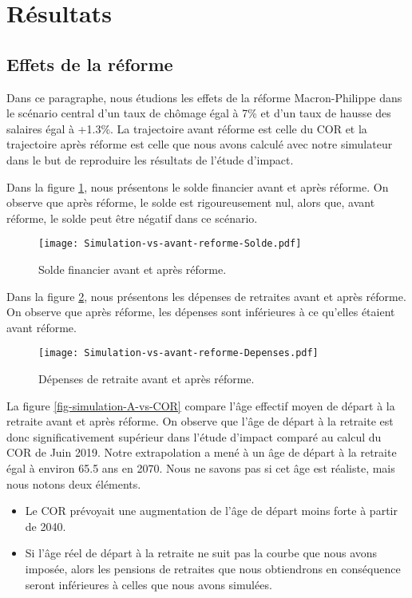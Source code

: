 \documentclass[10pt]{article}
\begin{document}

\section{Résultats}

\subsection{Effets de la réforme}

Dans ce paragraphe, nous étudions les effets de la réforme Macron-Philippe dans 
le scénario central d'un taux de chômage égal à 7\% 
et d'un taux de hausse des salaires égal à +1.3\%. 
La trajectoire avant réforme est celle du COR et la trajectoire après réforme est celle 
que nous avons calculé avec notre simulateur dans le but de reproduire les 
résultats de l'étude d'impact. 

Dans la figure \ref{fig-solde-avant-apres-reforme}, nous présentons le 
solde financier avant et après réforme. 
On observe que après réforme, le solde est rigoureusement nul, 
alors que, avant réforme, le solde peut être négatif dans ce scénario. 

\begin{figure}
\begin{center}
\texttt{[image: Simulation-vs-avant-reforme-Solde.pdf]}
\end{center}
\caption{Solde financier avant et après réforme.}
\label{fig-solde-avant-apres-reforme}
\end{figure}

Dans la figure \ref{fig-depenses-avant-apres-reforme}, nous présentons les 
dépenses de retraites avant et après réforme. 
On observe que après réforme, les dépenses sont inférieures à ce qu'elles 
étaient avant réforme. 

\begin{figure}
\begin{center}
\texttt{[image: Simulation-vs-avant-reforme-Depenses.pdf]}
\end{center}
\caption{Dépenses de retraite avant et après réforme.}
\label{fig-depenses-avant-apres-reforme}
\end{figure}

La figure \ref{fig-simulation-A-vs-COR} compare l'âge effectif moyen 
de départ à la retraite avant et après réforme. 
On observe que l'âge de départ à la retraite est donc 
significativement supérieur dans l'étude d'impact comparé au calcul du COR de Juin 2019. 
Notre extrapolation a mené à un âge de départ à la retraite égal à 
environ 65.5 ans en 2070. 
Nous ne savons pas si cet âge est réaliste, mais nous notons deux éléments. 
\begin{itemize}
\item Le COR prévoyait une augmentation de l'âge de départ moins 
forte à partir de 2040. 
\item Si l'âge réel de départ à la retraite ne suit pas la courbe 
que nous avons imposée, alors les pensions de retraites que nous 
obtiendrons en conséquence seront inférieures à celles que nous avons 
simulées. 
\end{itemize}
\end{document}
